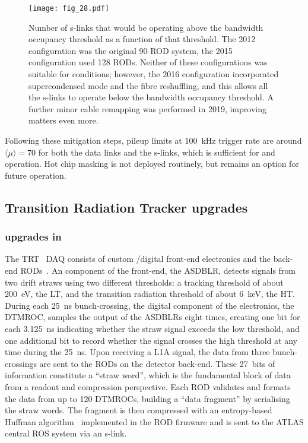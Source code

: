 \documentclass[cernpreprint, atlasdraft=false, UKenglish,british,orcidlogo, texmf, orcidlogo]{atlasdoc}
\begin{document}
\begin{figure}
\centering
\texttt{[image: fig\_28.pdf]}
\caption{Number of \glspl{s-link} that would be operating above the bandwidth occupancy threshold as a function of that threshold. The 2012 configuration was the original 90-\gls{ROD} system, the 2015 configuration used 128 \glspl{ROD}. Neither of these configurations was suitable for \RunThr conditions; however, the 2016 configuration incorporated supercondensed mode and the fibre reshuffling, and this allows all the \glspl{s-link} to operate below the bandwidth occupancy threshold. A further minor cable remapping was performed in 2019, improving matters even more.}
\label{fig:SCT_SLINK}
\end{figure}
 
Following these mitigation steps, pileup limits at \SI{100}{\kHz} trigger rate are around $\langle\mu\rangle = 70$ for both the data links and the \glspl{s-link}, which is sufficient for \RunTwo and \RunThr operation. Hot chip masking is not deployed routinely, but remains an option for future operation.
 
 


 

\subsection{Transition Radiation Tracker upgrades}
\label{sec:ID-TRT}
 
\subsubsection{  upgrades in \RunTwo}
The \gls{TRT}~\cite{TRT,TRTBarrel,TRTEndcap} \gls{DAQ} consists of custom \analog/digital front-end electronics and the back-end \glspl{ROD}~\cite{TRTElectronics}.
An \analog component of the front-end, the \gls{ASDBLR}, detects signals from two drift straws using two different thresholds: a tracking threshold of about \SI{200}{\eV}, the \gls{LT}, and the transition radiation threshold of about \SI{6}{\kilo\eV}, the \gls{HT}.
During each \SI{25}{\nano\second} bunch-crossing, the digital component of the electronics, the \gls{DTMROC}, samples the output of the \glspl{ASDBLR} eight times, creating one bit for each \SI{3.125}{\ns} indicating whether the straw signal exceeds the low threshold, and one additional bit to record whether the signal crosses the high threshold at any time during the 25~ns.
Upon receiving a \gls{L1A} signal, the data from three bunch-crossings are sent to the \glspl{ROD} on the detector back-end.
These 27~bits of information constitute a ``straw word'', which is the fundamental block of data from a readout and compression perspective.
Each \gls{ROD} validates and formats the data from up to 120 \glspl{DTMROC}, building a ``data fragment'' by serialising the straw words.
The fragment is then compressed with an entropy-based Huffman algorithm~\cite{Huffman} implemented in the \gls{ROD} firmware and is sent to the ATLAS central \gls{ROS} system via an \gls{s-link}.
 
\end{document}
